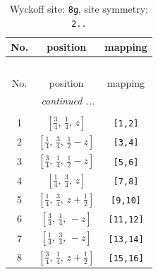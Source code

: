 \documentclass[fleqn,8pt]{jsarticle}
\begin{document}
\begin{longtable}{ccc}
\caption{Wyckoff site: {\tt 8g}, site symmetry: {\tt 2..}}
 \\
 \hline \hline
No. & position & mapping \\ \hline \endfirsthead

\multicolumn{2}{l}{\tablename\ \thetable{}} \\
 \hline \hline
No. & position & mapping \\ \hline \endhead

 \hline \hline
\multicolumn{2}{r}{\footnotesize\it continued ...} \\ \endfoot

 \hline \hline
\multicolumn{2}{r}{} \\ \endlastfoot

1 & $\left[ \frac{3}{4},\, \frac{1}{4},\, z \right]$ & {\tt [1,2]} \\ \hline
2 & $\left[ \frac{1}{4},\, \frac{3}{4},\, \frac{1}{2} - z \right]$ & {\tt [3,4]} \\ \hline
3 & $\left[ \frac{3}{4},\, \frac{1}{4},\, \frac{1}{2} - z \right]$ & {\tt [5,6]} \\ \hline
4 & $\left[ \frac{1}{4},\, \frac{3}{4},\, z \right]$ & {\tt [7,8]} \\ \hline
5 & $\left[ \frac{1}{4},\, \frac{3}{4},\, z + \frac{1}{2} \right]$ & {\tt [9,10]} \\ \hline
6 & $\left[ \frac{3}{4},\, \frac{1}{4},\, - z \right]$ & {\tt [11,12]} \\ \hline
7 & $\left[ \frac{1}{4},\, \frac{3}{4},\, - z \right]$ & {\tt [13,14]} \\ \hline
8 & $\left[ \frac{3}{4},\, \frac{1}{4},\, z + \frac{1}{2} \right]$ & {\tt [15,16]} \\
\end{longtable}
\renewcommand{\arraystretch}{1.2}
\end{document}
